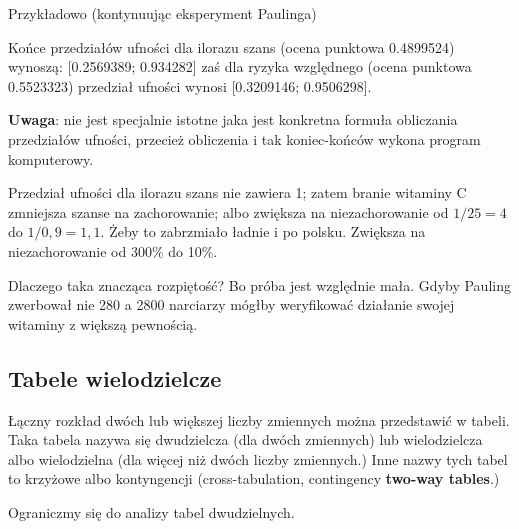 \documentclass[
  openany]{book}
\begin{document}
Przykładowo (kontynuując eksperyment Paulinga)

Końce przedziałów ufności dla ilorazu szans (ocena punktowa 0.4899524) wynoszą:
{[}0.2569389; 0.934282{]} zaś dla
ryzyka względnego (ocena punktowa 0.5523323) przedział ufności wynosi {[}0.3209146; 0.9506298{]}.

\textbf{Uwaga}: nie jest specjalnie istotne jaka jest konkretna formuła obliczania
przedziałów ufności, przecież obliczenia i tak koniec-końców wykona
program komputerowy.

Przedział ufności dla ilorazu szans nie zawiera 1;
zatem branie witaminy C zmniejsza szanse na zachorowanie;
albo zwiększa na niezachorowanie od \(1/25 = 4\) do \(1/0,9 = 1,1\). Żeby
to zabrzmiało ładnie i po polsku.
Zwiększa na niezachorowanie od 300\% do 10\%.

Dlaczego taka znacząca rozpiętość? Bo próba jest względnie mała. Gdyby
Pauling zwerbował nie 280 a 2800 narciarzy mógłby weryfikować działanie
swojej witaminy z większą pewnością.

\hypertarget{tabele-wielodzielcze}{%
\subsection{Tabele wielodzielcze}\label{tabele-wielodzielcze}}

Łączny rozkład dwóch lub większej liczby zmiennych można przedstawić
w tabeli. Taka tabela nazywa się dwudzielcza (dla dwóch zmiennych)
lub wielodzielcza albo wielodzielna (dla więcej niż dwóch liczby zmiennych.)
Inne nazwy tych tabel to krzyżowe albo kontyngencji
(cross-tabulation, contingency \textbf{two-way tables}.)

Ograniczmy się do analizy tabel dwudzielnych.
\end{document}
